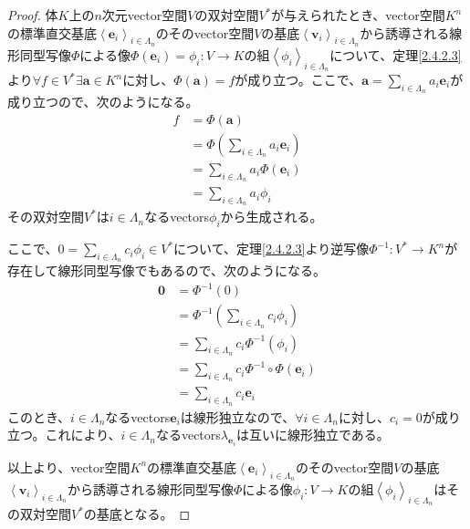 \documentclass[dvipdfmx]{jsarticle}
\begin{document}
\begin{proof}
体$K$上の$n$次元vector空間$V$の双対空間$V^{*}$が与えられたとき、vector空間$K^{n}$の標準直交基底$\left\langle \mathbf{e}_{i} \right\rangle_{i \in \varLambda_{n}}$のそのvector空間$V$の基底$\left\langle \mathbf{v}_{i} \right\rangle_{i \in \varLambda_{n}}$から誘導される線形同型写像$\varPhi$による像$\varPhi\left( \mathbf{e}_{i} \right) = \phi_{i}:V \rightarrow K$の組$\left\langle \phi_{i} \right\rangle_{i \in \varLambda_{n}}$について、定理\ref{2.4.2.3}より$\forall f \in V^{*}\exists\mathbf{a} \in K^{n}$に対し、$\varPhi\left( \mathbf{a} \right) = f$が成り立つ。ここで、$\mathbf{a} = \sum_{i \in \varLambda_{n}} {a_{i}\mathbf{e}_{i}}$が成り立つので、次のようになる。
\begin{align*}
f &= \varPhi\left( \mathbf{a} \right)\\
&= \varPhi\left( \sum_{i \in \varLambda_{n}} {a_{i}\mathbf{e}_{i}} \right)\\
&= \sum_{i \in \varLambda_{n}} {a_{i}\varPhi\left( \mathbf{e}_{i} \right)}\\
&= \sum_{i \in \varLambda_{n}} {a_{i}\phi_{i}}
\end{align*}
その双対空間$V^{*}$は$i \in \varLambda_{n}$なるvectors$\phi_{i}$から生成される。\par
ここで、$0 = \sum_{i \in \varLambda_{n}} {c_{i}\phi_{i}} \in V^{*}$について、定理\ref{2.4.2.3}より逆写像$\varPhi^{- 1}:V^{*} \rightarrow K^{n}$が存在して線形同型写像でもあるので、次のようになる。
\begin{align*}
\mathbf{0} &= \varPhi^{- 1}(0)\\
&= \varPhi^{- 1}\left( \sum_{i \in \varLambda_{n}} {c_{i}\phi_{i}} \right)\\
&= \sum_{i \in \varLambda_{n}} {c_{i}\varPhi^{- 1}\left( \phi_{i} \right)}\\
&= \sum_{i \in \varLambda_{n}} {c_{i}\varPhi^{- 1} \circ \varPhi\left( \mathbf{e}_{i} \right)}\\
&= \sum_{i \in \varLambda_{n}} {c_{i}\mathbf{e}_{i}}
\end{align*}
このとき、$i \in \varLambda_{n}$なるvectors$\mathbf{e}_{i}$は線形独立なので、$\forall i \in \varLambda_{n}$に対し、$c_{i} = 0$が成り立つ。これにより、$i \in \varLambda_{n}$なるvectors$\lambda_{\mathbf{e}_{i}}$は互いに線形独立である。\par
以上より、vector空間$K^{n}$の標準直交基底$\left\langle \mathbf{e}_{i} \right\rangle_{i \in \varLambda_{n}}$のそのvector空間$V$の基底$\left\langle \mathbf{v}_{i} \right\rangle_{i \in \varLambda_{n}}$から誘導される線形同型写像$\varPhi$による像$\phi_{i}:V \rightarrow K$の組$\left\langle \phi_{i} \right\rangle_{i \in \varLambda_{n}}$はその双対空間$V^{*}$の基底となる。
\end{proof}
\end{document}
